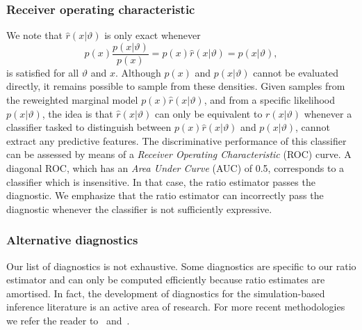 \documentclass[fleqn,usenatbib]{mnras}
\begin{document}
\subsubsection{Receiver operating characteristic}
\label{sec:diagnostic_roc}
We note that $\hat{r}(x\vert\vartheta)$ is only exact whenever
\begin{equation}
  p(x)\frac{p(x\vert\vartheta)}{p(x)} = p(x)\hat{r}(x\vert\vartheta) = p(x\vert\vartheta),
\end{equation}
is satisfied for all $\vartheta$ and $x$.
Although $p(x)$ and $p(x\vert\vartheta)$ cannot be evaluated directly, 
it remains possible to sample from these densities. Given samples from the reweighted
marginal model $p(x)\hat{r}(x\vert\vartheta)$, and from a specific
likelihood $p(x\vert\vartheta)$, the idea is that $\hat{r}(x\vert\vartheta)$
can only be equivalent to $r(x\vert\vartheta)$ whenever a classifier tasked to distinguish
between $p(x)\hat{r}(x\vert\vartheta)$ and $p(x\vert\vartheta)$, cannot extract any
predictive features.
The discriminative performance of this classifier can be assessed
by means of a \emph{Receiver Operating Characteristic} (ROC) curve. A diagonal ROC, which has an \emph{Area Under Curve} (AUC) of 0.5, corresponds to a classifier which is insensitive.
In that case, the ratio estimator passes the diagnostic.
We emphasize that the ratio estimator can incorrectly pass the diagnostic whenever
the classifier is not sufficiently expressive.

\subsubsection{Alternative diagnostics}
\label{sec:alternative_diagnostics}
Our list of diagnostics is not exhaustive.
Some diagnostics are specific to our ratio estimator and
can only be computed efficiently because ratio estimates are amortised.
In fact, the development of diagnostics
for the simulation-based inference literature is an active area of research. For more recent
methodologies we refer the reader to~\citet{sbc} and~\citet{dalmasso2020validation}.
\end{document}
